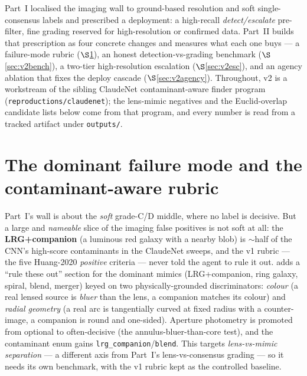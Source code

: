 \documentclass[11pt,letterpaper]{article}
\begin{document}
Part~I localised the imaging wall to ground-based resolution and soft single-consensus labels and
prescribed a deployment: a high-recall \emph{detect/escalate} pre-filter, fine grading reserved for
high-resolution or confirmed data. Part~II builds that prescription as four concrete changes and
measures what each one buys --- a failure-mode rubric ($\S$\ref{sec:v2}), an honest
detection-vs-grading benchmark ($\S$\ref{sec:v2bench}), a two-tier high-resolution escalation
($\S$\ref{sec:v2esc}), and an agency ablation that fixes the deploy cascade ($\S$\ref{sec:v2agency}).
Throughout, v2 is a workstream of the sibling ClaudeNet contaminant-aware finder program
(\texttt{reproductions/\allowbreak claudenet}); the lens-mimic negatives and the Euclid-overlap candidate lists
below come from that program, and every number is read from a tracked artifact under
\texttt{outputs/}.

\section{The dominant failure mode and the contaminant-aware rubric}
\label{sec:v2}
Part~I's wall is about the \emph{soft} grade-C/D middle, where no label is decisive. But a large and
\emph{nameable} slice of the imaging false positives is not soft at all: the \textbf{LRG+companion}
(a luminous red galaxy with a nearby blob) is ${\sim}$half of the CNN's high-score contaminants in
the ClaudeNet sweeps, and the v1 rubric --- the five Huang-2020 \emph{positive} criteria --- never
told the agent to rule it out.  adds a ``rule these out''
section for the dominant mimics (LRG+companion, ring galaxy, spiral, blend, merger) keyed on two
physically-grounded discriminators: \emph{colour} (a real lensed source is \emph{bluer} than the
lens, a companion matches its colour) and \emph{radial geometry} (a real arc is tangentially curved
at fixed radius with a counter-image, a companion is round and one-sided). Aperture photometry is
promoted from optional to often-decisive (the annulus-bluer-than-core test), and the contaminant
enum gains \texttt{lrg\_companion}/\texttt{blend}. This targets \emph{lens-vs-mimic separation} --- a
different axis from Part~I's lens-vs-consensus grading --- so it needs its own benchmark, with the
v1 rubric kept as the controlled baseline.
\end{document}
